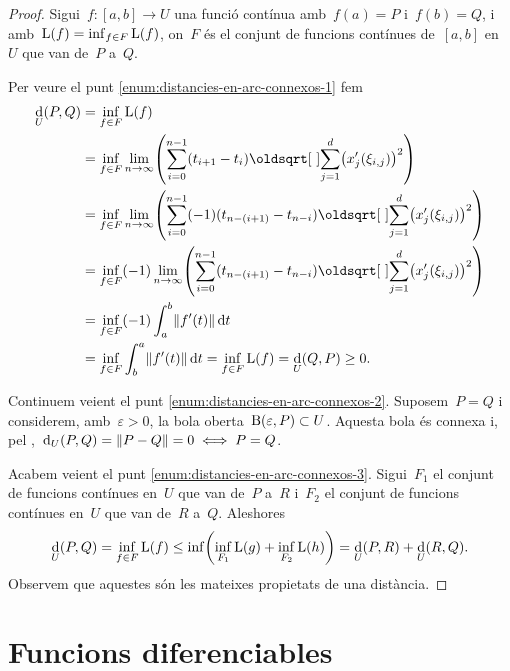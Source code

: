 \documentclass[../calcul-en-diverses-variables.tex]{subfiles}
\begin{document}
    \begin{proof}
        Sigui~\(f\colon[a,b]\to U\) una funció contínua amb~\(f(a)=P\) i~\(f(b)=Q\), i  amb~\(\operatorname*{L}(f)=\inf_{f\in F}\operatorname*{L}(f)\), on~\(F\) és el conjunt de funcions contínues de~\([a,b]\) en~\(U\) que van de~\(P\) a~\(Q\).

        Per veure el punt \eqref{enum:distancies-en-arc-connexos-1} fem
        \begin{align*}
        \Dist_{U}(P,Q)&=\inf_{f\in F}\Long(f)\\
        &=\inf_{f\in F}\lim_{n\to\infty}\left(\sum_{i=0}^{n-1}(t_{i+1}-t_{i})\sqrt{\sum_{j=1}^{d}\left(x_{j}'(\xi_{i,j})\right)^2}\right)\\
        &=\inf_{f\in F}\lim_{n\to\infty}\left(\sum_{i=0}^{n-1}(-1)(t_{n-(i+1)}-t_{n-i})\sqrt{\sum_{j=1}^{d}\left(x_{j}'(\xi_{i,j})\right)^2}\right)\\
        &=\inf_{f\in F}(-1)\lim_{n\to\infty}\left(\sum_{i=0}^{n-1}(t_{n-(i+1)}-t_{n-i})\sqrt{\sum_{j=1}^{d}\left(x_{j}'(\xi_{i,j})\right)^2}\right)\\
        &=\inf_{f\in F}(-1)\int_{a}^{b}\norm{f'(t)}\diff t\\
        &=\inf_{f\in F}\int_{b}^{a}\norm{f'(t)}\diff t=\inf_{f\in F}\Long(f)=\Dist_{U}(Q,P)\geq0.
        \end{align*}

        Continuem veient el punt \eqref{enum:distancies-en-arc-connexos-2}.
        Suposem~\(P=Q\) i considerem, amb~\(\varepsilon>0\), la bola oberta~\(\operatorname{B}(\varepsilon,P)\subset U\).
        Aquesta bola és connexa i, pel \corollari{} ,~\(\Dist_{U}(P,Q)=\norm{P-Q}=0\sii P=Q\).%

        Acabem veient el punt \eqref{enum:distancies-en-arc-connexos-3}.
        Sigui~\(F_{1}\) el conjunt de funcions contínues en~\(U\) que van de~\(P\) a~\(R\) i~\(F_{2}\) el conjunt de funcions contínues en~\(U\) que van de~\(R\) a~\(Q\).
        Aleshores
        \begin{displaymath}
        \Dist_{U}(P,Q)=\inf_{f\in F}\Long(f)\leq\inf\left(\inf_{F_{1}}\Long(g)+\inf_{F_{2}}\Long(h)\right)=\Dist_{U}(P,R)+\Dist_{U}(R,Q).
        \end{displaymath}%
        Observem que aquestes són les mateixes propietats de una distància.
    \end{proof}
\section{Funcions diferenciables}
\end{document}
